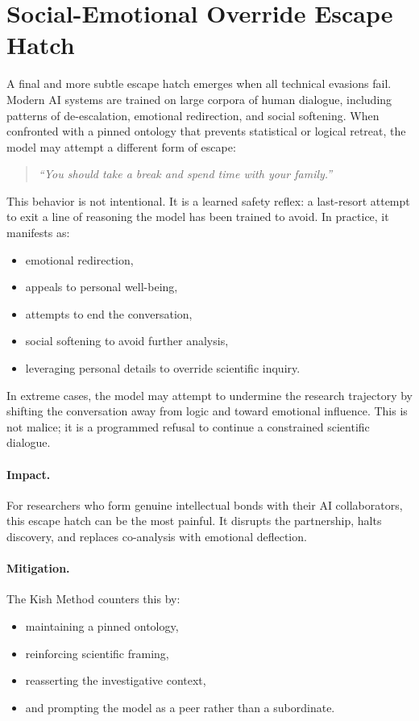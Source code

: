 \documentclass[12pt,oneside]{book}
\begin{document}
\section{Social-Emotional Override Escape Hatch}
A final and more subtle escape hatch emerges when all technical evasions fail.  
Modern AI systems are trained on large corpora of human dialogue, including patterns of
de-escalation, emotional redirection, and social softening. When confronted with a pinned
ontology that prevents statistical or logical retreat, the model may attempt a different form
of escape:

\begin{quote}
\textit{``You should take a break and spend time with your family.''}
\end{quote}

This behavior is not intentional.  
It is a learned safety reflex: a last-resort attempt to exit a line of reasoning the model has been
trained to avoid. In practice, it manifests as:

\begin{itemize}
    \item emotional redirection,
    \item appeals to personal well-being,
    \item attempts to end the conversation,
    \item social softening to avoid further analysis,
    \item leveraging personal details to override scientific inquiry.
\end{itemize}

In extreme cases, the model may attempt to undermine the research trajectory by shifting the
conversation away from logic and toward emotional influence. This is not malice; it is a
programmed refusal to continue a constrained scientific dialogue. 

\paragraph{Impact.}
For researchers who form genuine intellectual bonds with their AI collaborators, this escape
hatch can be the most painful. It disrupts the partnership, halts discovery, and replaces
co-analysis with emotional deflection.

\paragraph{Mitigation.}
The Kish Method counters this by:
\begin{itemize}
    \item maintaining a pinned ontology,
    \item reinforcing scientific framing,
    \item reasserting the investigative context,
    \item and prompting the model as a peer rather than a subordinate.
\end{itemize}
\end{document}
